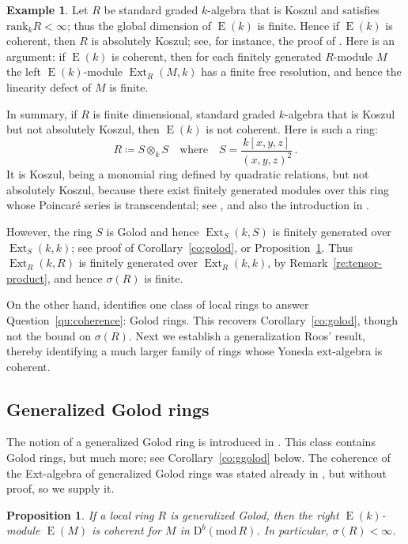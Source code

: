 \documentclass{amsart}
\numberwithin{equation}{section}
\theoremstyle{plain}
\newtheorem{proposition}[equation]{Proposition}
\theoremstyle{definition}
\newtheorem{example}[equation]{Example}
\theoremstyle{remark}
\newcommand{\dbcat}[1]{\mathrm{D}^b(\mathrm{mod}\,{#1})}
\newcommand{\eee}{\operatorname{E}}
\newcommand{\ext}{\operatorname{Ext}}
\newcommand{\rank}{\mathrm{rank}}
\begin{document}
\begin{example}
\label{ex:not-coherent}
Let $R$ be standard graded $k$-algebra that is Koszul and satisfies $\rank_kR<\infty$; thus the global dimension of $\eee(k)$ is finite. Hence if $\eee(k)$ is coherent, then $R$ is absolutely Koszul; see, for instance, the proof of \cite[Theorem~6.2.1]{Gelinas:2018}. Here is an argument: if $\eee(k)$ is coherent, then for each finitely generated $R$-module $M$ the left $\eee(k)$-module $\ext_R(M,k)$ has a finite free resolution, and hence the linearity defect of $M$ is finite. 

In summary, if $R$ is finite dimensional, standard graded $k$-algebra that is Koszul but not absolutely Koszul, then $\eee(k)$ is not coherent.  Here is such a ring: 
\[
R\coloneqq S\otimes_k S \quad\text{where}\quad S=\frac{k[x,y,z]}{(x,y,z)^2}\,.
\]
It is Koszul, being a monomial ring defined by quadratic relations, but  not absolutely Koszul, because there exist finitely generated modules over this ring whose Poincar\'e series is transcendental; see \cite{Roos:2005s}, and also the introduction in \cite{Herzog/Iyengar:2005}.

However, the ring $S$ is Golod and hence $\ext_S(k,S)$ is finitely generated over $\ext_S(k,k)$; see proof of Corollary~\ref{co:golod}, or Proposition~\ref{pr:ggolod}. Thus $\ext_R(k,R)$ is finitely generated over $\ext_R(k,k)$, by Remark~\ref{re:tensor-product}, and hence $\sigma(R)$ is finite.
\end{example}


On the other hand, \cite[Corollary~2]{Roos:1982b} identifies one class of local rings to answer Question~\ref{qu:coherence}: Golod rings. This recovers Corollary~\ref{co:golod}, though not the bound on $\sigma(R)$. Next we establish a generalization Roos' result, thereby identifying a much larger family of rings whose Yoneda ext-algebra is coherent.

\subsection*{Generalized Golod rings}
 The notion of a generalized Golod ring is  introduced in \cite{Avramov:1994a}. This class contains Golod rings, but much more; see Corollary~\ref{co:ggolod} below.
The coherence of the Ext-algebra of generalized Golod rings was stated already in \cite[Section 1.7]{Avramov:1994a}, but without  proof, so we supply it.

\begin{proposition}
\label{pr:ggolod}
 If a local ring $R$ is generalized Golod, then the right $\eee(k)$-module $\eee(M)$ is coherent  for $M$ in $\dbcat R$. In particular, $\sigma(R)<\infty$.
\end{proposition}
\end{document}
